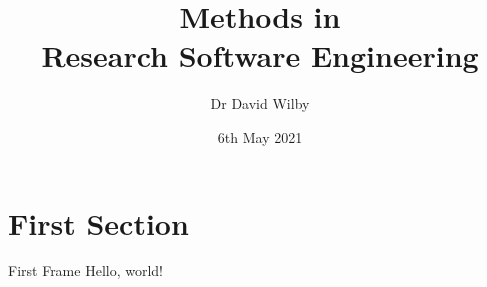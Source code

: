 \documentclass{beamer}
\title{Methods in \\ Research Software Engineering}
\date{6th May 2021}
\author{Dr David Wilby}
\institute{Research Software Engineering Team,\\ The University of Sheffield}
\begin{document}
  \maketitle
  \section{First Section}
  \begin{frame}{First Frame}
    Hello, world!
  \end{frame}
\end{document}

